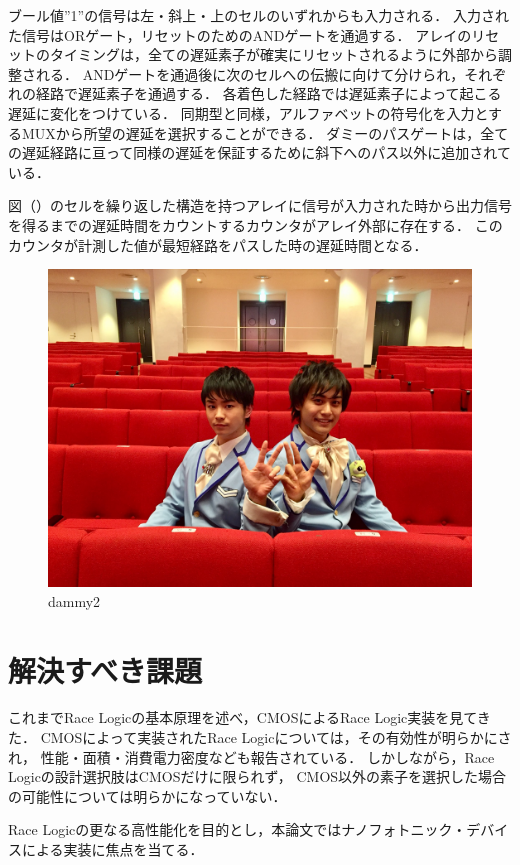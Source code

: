 \begin{itemize}
ブール値”1”の信号は左・斜上・上のセルのいずれからも入力される．
入力された信号はORゲート，リセットのためのANDゲートを通過する．
アレイのリセットのタイミングは，全ての遅延素子が確実にリセットされるように外部から調整される．
ANDゲートを通過後に次のセルへの伝搬に向けて分けられ，それぞれの経路で遅延素子を通過する．
各着色した経路では遅延素子によって起こる遅延に変化をつけている．
同期型と同様，アルファベットの符号化を入力とするMUXから所望の遅延を選択することができる．
ダミーのパスゲートは，全ての遅延経路に亘って同様の遅延を保証するために斜下へのパス以外に追加されている．

図（）のセルを繰り返した構造を持つアレイに信号が入力された時から出力信号を得るまでの遅延時間をカウントするカウンタがアレイ外部に存在する．
このカウンタが計測した値が最短経路をパスした時の遅延時間となる．
\begin{figure}[t!]
\begin{center}
\includegraphics[keepaspectratio,scale=0.01]{fig/dammy.jpg}
\caption{dammy2}
\label{dammy2}
\end{center}
\end{figure}
\end{itemize}
\section{解決すべき課題}
これまでRace Logicの基本原理を述べ，CMOSによるRace Logic実装を見てきた．
CMOSによって実装されたRace Logicについては，その有効性が明らかにされ，
性能・面積・消費電力密度なども報告されている．
しかしながら，Race Logicの設計選択肢はCMOSだけに限られず，
CMOS以外の素子を選択した場合の可能性については明らかになっていない．

Race Logicの更なる高性能化を目的とし，本論文ではナノフォトニック・デバイスによる実装に焦点を当てる．
